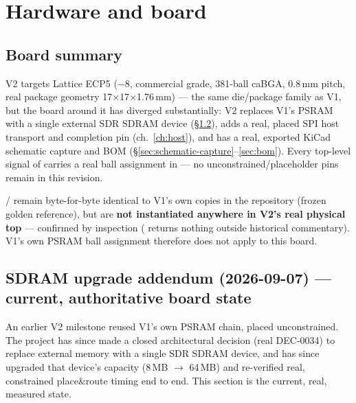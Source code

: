 \chapter{Hardware and board}
\label{ch:hw}

\section{Board summary}
V2 targets Lattice ECP5  ($-8$, commercial
grade, 381-ball caBGA, 0.8\,mm pitch, real package geometry
17$\times$17$\times$1.76\,mm) --- the same die/package family as V1,
but the board around it has diverged substantially: V2 replaces V1's
PSRAM with a single external SDR SDRAM device (\S\ref{sec:sdram-addendum}),
adds a real, placed SPI host transport and 
completion pin (ch.~\ref{ch:host}), and has a real, exported KiCad
schematic capture and BOM (\S\ref{sec:schematic-capture}--\ref{sec:bom}).
Every top-level signal of  carries a real
ball assignment in  ---
no unconstrained/placeholder pins remain in this revision.

\begin{fnnote}
/ remain byte-for-byte
identical to V1's own copies in the repository (frozen golden reference),
but are \textbf{not instantiated anywhere in V2's real physical top}
--- confirmed by inspection ( returns
nothing outside historical commentary). V1's own PSRAM ball assignment
therefore does not apply to this board.
\end{fnnote}

\section{SDRAM upgrade addendum (2026-09-07) --- current, authoritative
board state}
\label{sec:sdram-addendum}
\begin{fnwarn}
An earlier V2 milestone reused V1's own PSRAM chain, placed
unconstrained. The project has since made a closed architectural
decision (real  DEC-0034) to replace external
memory with a single SDR SDRAM device, and has since upgraded that
device's capacity (8\,MB $\to$ 64\,MB) and re-verified real,
constrained place\&route timing end to end. This section is the
current, real, measured state.
\end{fnwarn}

